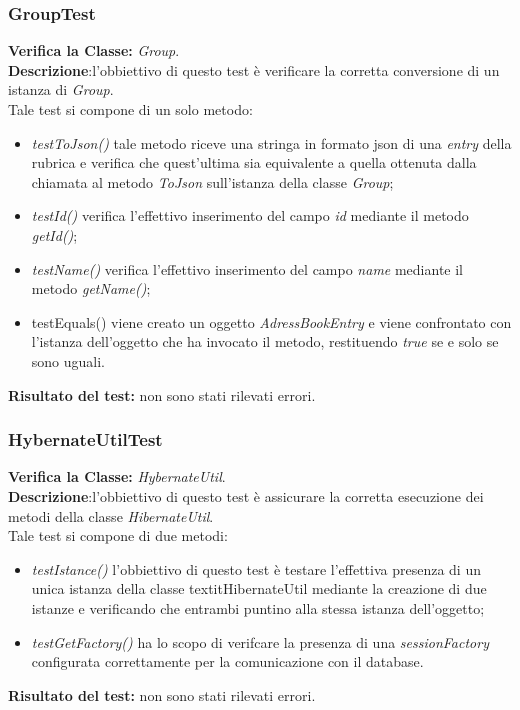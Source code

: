 \subsubsection{GroupTest}
\textbf{Verifica la Classe:} \textit{Group}.\\
\textbf{Descrizione}:l'obbiettivo di questo test è verificare la corretta conversione di un istanza di \textit{Group}.\\
Tale test si compone di un solo metodo:
\begin{itemize}
\item \textit{testToJson() } tale metodo riceve una stringa in formato json di una 	\textit{entry} della rubrica e verifica che quest'ultima sia equivalente a quella ottenuta dalla chiamata al metodo \textit{ToJson} sull'istanza della classe \textit{Group};
\item \textit{testId() } verifica l'effettivo inserimento del campo \textit{id} mediante il metodo \textit{getId()};
\item \textit{testName() } verifica l'effettivo inserimento del campo \textit{name} mediante il metodo \textit{getName()};
\item{testEquals()} viene creato un oggetto \textit{AdressBookEntry} e viene confrontato con l'istanza dell'oggetto che ha invocato il metodo, restituendo \textit{true} se e solo se sono uguali.
\end{itemize}
\textbf{Risultato del test:} non sono stati rilevati errori.

\subsubsection{HybernateUtilTest}
\textbf{Verifica la Classe:} \textit{HybernateUtil}.\\
\textbf{Descrizione}:l'obbiettivo di questo test è assicurare la corretta esecuzione dei metodi della classe \textit{HibernateUtil}. \\
Tale test si compone di due metodi:
\begin{itemize}
\item \textit{testIstance() } l'obbiettivo di questo test è testare l'effettiva presenza di un unica istanza della classe textit{HibernateUtil} mediante la creazione di due istanze e verificando che entrambi puntino alla stessa istanza dell'oggetto;
\item \textit{testGetFactory()} ha lo scopo di verifcare la presenza di una \textit{sessionFactory} configurata correttamente per la comunicazione con il database.
\end{itemize}
\textbf{Risultato del test:} non sono stati rilevati errori.

